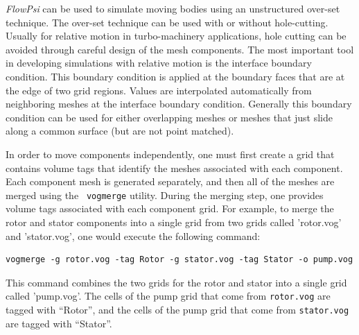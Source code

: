 \documentclass{article}
\begin{document}
{\em FlowPsi} can be used to simulate moving bodies using an unstructured
over-set technique.  The over-set technique can be used with or without
hole-cutting.  Usually for relative motion in turbo-machinery
applications, hole cutting can be avoided through careful design of
the mesh components.  The most important tool in developing
simulations with relative motion is the interface boundary condition.
This boundary condition is applied at the boundary faces that are at
the edge of two grid regions.  Values are interpolated automatically
from neighboring meshes at the interface boundary condition.
Generally this boundary condition can be used for either overlapping
meshes or meshes that just slide along a common surface (but are not
point matched).

In order to move components independently, one must first create a grid
that contains volume tags that identify the meshes associated with
each component.  Each component mesh is generated
separately, and then all of the meshes are merged using the {\tt
  vogmerge} utility.  During the merging step, one provides
volume tags associated with each component grid.  For example, to merge the
rotor and stator components into a single grid from two grids called
'rotor.vog' and 'stator.vog', one would execute the following command:
\begin{verbatim}
vogmerge -g rotor.vog -tag Rotor -g stator.vog -tag Stator -o pump.vog
\end{verbatim}
This command combines the two grids for the rotor and stator into a
single grid called 'pump.vog'.  The cells of the pump grid that come from
{\tt rotor.vog} are tagged with ``Rotor'', and the cells of the pump grid
that come from {\tt stator.vog} are tagged with ``Stator''. 
\end{document}
